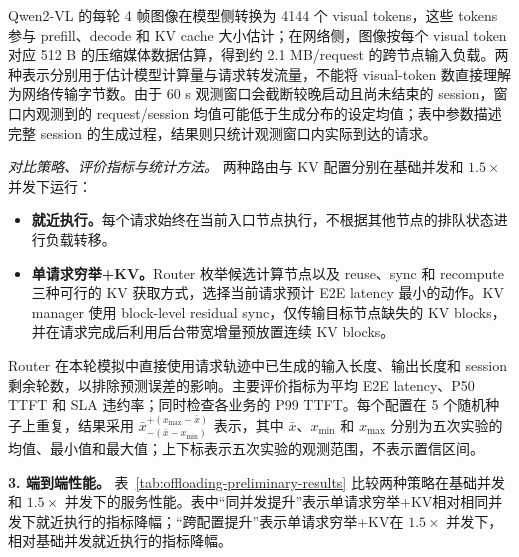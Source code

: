 Qwen2-VL 的每轮 4 帧图像在模型侧转换为 4144 个 visual tokens，这些 tokens 参与 prefill、decode 和 KV cache 大小估计；在网络侧，图像按每个 visual token 对应 512 B 的压缩媒体数据估算，得到约 2.1 MB/request 的跨节点输入负载。两种表示分别用于估计模型计算量与请求转发流量，不能将 visual-token 数直接理解为网络传输字节数。由于 60 s 观测窗口会截断较晚启动且尚未结束的 session，窗口内观测到的 request/session 均值可能低于生成分布的设定均值；表中参数描述完整 session 的生成过程，结果则只统计观测窗口内实际到达的请求。

\noindent\textit{对比策略、评价指标与统计方法。}
两种路由与 KV 配置分别在基础并发和 \(1.5\times\) 并发下运行：
\begin{itemize}
    \item \textbf{就近执行。}每个请求始终在当前入口节点执行，不根据其他节点的排队状态进行负载转移。
    \item \textbf{单请求穷举+KV。}Router 枚举候选计算节点以及 reuse、sync 和 recompute 三种可行的 KV 获取方式，选择当前请求预计 E2E latency 最小的动作。KV manager 使用 block-level residual sync，仅传输目标节点缺失的 KV blocks，并在请求完成后利用后台带宽增量预放置连续 KV blocks。
\end{itemize}
Router 在本轮模拟中直接使用请求轨迹中已生成的输入长度、输出长度和 session 剩余轮数，以排除预测误差的影响。主要评价指标为平均 E2E latency、P50 TTFT 和 SLA 违约率；同时检查各业务的 P99 TTFT。每个配置在 5 个随机种子上重复，结果采用
\(\bar{x}_{-(\bar{x}-x_{\min})}^{+(x_{\max}-\bar{x})}\)
表示，其中 \(\bar{x}\)、\(x_{\min}\) 和 \(x_{\max}\) 分别为五次实验的均值、最小值和最大值；上下标表示五次实验的观测范围，不表示置信区间。

\medskip
\noindent\textbf{3. 端到端性能。}
表~\ref{tab:offloading-preliminary-results} 比较两种策略在基础并发和 \(1.5\times\) 并发下的服务性能。表中“同并发提升”表示单请求穷举+KV相对相同并发下就近执行的指标降幅；“跨配置提升”表示单请求穷举+KV在 \(1.5\times\) 并发下，相对基础并发就近执行的指标降幅。

